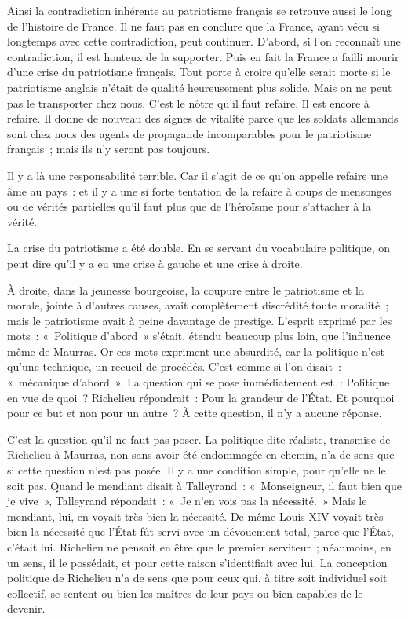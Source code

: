 \documentclass[french,twoside]{book} %
\begin{document}
Ainsi la contradiction inhérente au patriotisme français se retrouve aussi le long de l'histoire de France. Il ne faut pas en conclure que la France, ayant vécu si longtemps avec cette contradiction, peut continuer. D'abord, si l'on reconnaît une contradiction, il est honteux de la supporter. Puis en fait la France a failli mourir d'une crise du patriotisme français. Tout porte à croire qu'elle serait morte si le patriotisme anglais n'était de qualité heureusement plus solide. Mais on ne peut pas le transporter chez nous. C’est le nôtre qu'il faut refaire. Il est encore à refaire. Il donne de nouveau des signes de vitalité parce que les soldats allemands sont chez nous des agents de propagande incomparables pour le patriotisme français ; mais ils n'y seront pas toujours.\par
Il y a là une responsabilité terrible. Car il s'agit de ce qu'on appelle refaire une âme au pays : et il y a une si forte tentation de la refaire à coups de mensonges ou de vérités partielles qu'il faut plus que de l'héroïsme pour s'attacher à la vérité.\par
La crise du patriotisme a été double. En se servant du vocabulaire politique, on peut dire qu'il y a eu une crise à gauche et une crise à droite.\par
À droite, dans la jeunesse bourgeoise, la coupure entre le patriotisme et la morale, jointe à d'autres causes, avait complètement discrédité toute moralité ; mais le patriotisme avait à peine davantage de prestige. L'esprit exprimé par les mots : « Politique d'abord » s'était, étendu beaucoup plus loin, que l'influence même de Maurras. Or ces mots expriment une absurdité, car la politique n'est qu'une technique, un recueil de procédés. C'est comme si l'on disait : « mécanique d'abord », La question qui se pose immédiatement est : Politique en vue de quoi ? Richelieu répondrait : Pour la grandeur de l'État. Et pourquoi pour ce but et non pour un autre ? À cette question, il n'y a aucune réponse.\par
C'est la question qu'il ne faut pas poser. La politique dite réaliste, transmise de Richelieu à Maurras, non sans avoir été endommagée en chemin, n'a de sens que si cette question n'est pas posée. Il y a une condition simple, pour qu'elle ne le soit pas. Quand le mendiant disait à Talleyrand : « Monseigneur, il faut bien que je vive », Talleyrand répondait : « Je n'en vois pas la nécessité. » Mais le mendiant, lui, en voyait très bien la nécessité. De même Louis XIV voyait très bien la nécessité que l'État fût servi avec un dévouement total, parce que l'État, c'était lui. Richelieu ne pensait en être que le premier serviteur ; néanmoins, en un sens, il le possédait, et pour cette raison s'identifiait avec lui. La conception politique de Richelieu n'a de sens que pour ceux qui, à titre soit individuel soit collectif, se sentent ou bien les maîtres de leur pays ou bien capables de le devenir.\par
\end{document}
